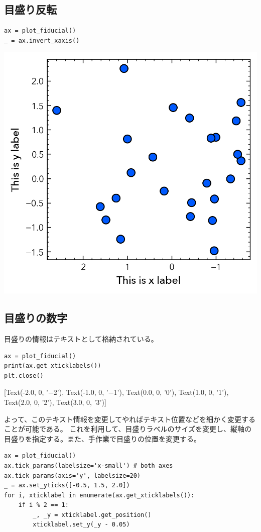 \documentclass[a4paper, 10pt, notitlepage, twocolumn, uplatex, oneside, dvipdfmx]{jsarticle}
\begin{document}
\subsection{目盛り反転}
\label{sec:org5fe16c1}
\begin{verbatim}
ax = plot_fiducial()
_ = ax.invert_xaxis()
\end{verbatim}

\begin{center}
\includegraphics[width=1.0\linewidth]{./obipy-resources/params_tick_inverse.png}
\end{center}
\subsection{目盛りの数字}
\label{sec:org7e37333}
目盛りの情報はテキストとして格納されている。
\begin{verbatim}
ax = plot_fiducial()
print(ax.get_xticklabels())
plt.close()
\end{verbatim}

\label{}
{[}Text(-2.0, 0, '−2'), Text(-1.0, 0, '−1'), Text(0.0, 0, '0'), Text(1.0, 0, '1'), Text(2.0, 0, '2'), Text(3.0, 0, '3')]

よって、このテキスト情報を変更してやればテキスト位置などを細かく変更することが可能である。
これを利用して、目盛りラベルのサイズを変更し、縦軸の目盛りを指定する。また、手作業で目盛りの位置を変更する。
\begin{verbatim}
ax = plot_fiducial()
ax.tick_params(labelsize='x-small') # both axes
ax.tick_params(axis='y', labelsize=20)
_ = ax.set_yticks([-0.5, 1.5, 2.0])
for i, xticklabel in enumerate(ax.get_xticklabels()):
    if i % 2 == 1:
        _, _y = xticklabel.get_position()
        xticklabel.set_y(_y - 0.05)
\end{verbatim}
\end{document}
